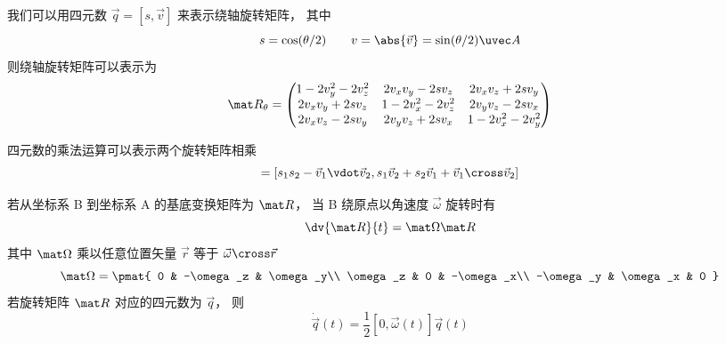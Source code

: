 

我们可以用四元数 $\vec q = [s, \vec v]$ 来表示绕轴旋转矩阵， 其中
\begin{equation}
s = \cos(\theta/2) \qquad v = \abs{\vec v} = \sin(\theta/2)\uvec A
\end{equation}
则绕轴旋转矩阵可以表示为
\begin{equation}
\mat R_\theta =
\begin{pmatrix}
1 - 2v_y^2 - 2v_z^2 & 2v_xv_y - 2sv_z  & 2v_x v_z + 2s v_y\\
2v_x v_y + 2sv_z & 1 - 2v_x^2 - 2v_z^2 & 2v_y v_z - 2s v_x\\
2v_x v_z - 2s v_y & 2v_y v_z + 2s v_x & 1 - 2v_x^2 - 2v_y^2
\end{pmatrix}
\end{equation}

四元数的乘法运算可以表示两个旋转矩阵相乘
\begin{equation}
[s_1, \vec v_1] [s_2, \vec v_2] = [s_1 s_2 - \vec v_1 \vdot \vec v_2, s_1 \vec v_2 + s_2 \vec v_1 + \vec v_1 \cross \vec v_2]
\end{equation}

若从坐标系 B 到坐标系 A 的基底变换矩阵为 $\mat R$， 当 B 绕原点以角速度 $\vec \omega$ 旋转时有
\begin{equation}
\dv{\mat R}{t} = \mat \Omega \mat R
\end{equation}
其中 $\mat\Omega$ 乘以任意位置矢量 $\vec r$ 等于 $\vec \omega \cross \vec r$
\begin{equation}
\mat \Omega = \pmat{
0 & -\omega_z & \omega_y\\
\omega_z & 0 & -\omega_x\\
-\omega_y & \omega_x & 0
}\end{equation}
若旋转矩阵 $\mat R$ 对应的四元数为 $\vec q$， 则
\begin{equation}
\dot {\vec q}(t) = \frac12 [0, \vec \omega(t)] \vec q(t)
\end{equation}

